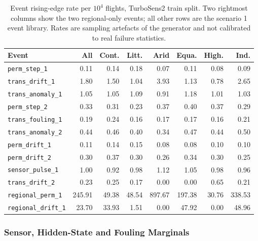 \begin{table}[h]
\centering
\caption{Event rising-edge rate per $10^4$ flights, TurboSens2 train split.
Two rightmost columns show the two regional-only events; all other rows
are the scenario 1 event library. Rates are sampling artefacts of the
generator and not calibrated to real failure statistics.}
\label{tab:scen4_event_rates}
\small
\begin{tabular}{lrrrrrrr}
\toprule
Event & All & Cont. & Litt. & Arid & Equa. & High. & Ind. \\
\midrule
\texttt{perm\_step\_1}      &   0.11 &  0.14 &  0.18 &  0.07 &  0.11 &  0.08 &  0.09 \\
\texttt{trans\_drift\_1}     &   1.80 &  1.50 &  1.04 &  3.93 &  1.13 &  0.78 &  2.65 \\
\texttt{trans\_anomaly\_1}                &   1.05 &  1.05 &  1.09 &  0.91 &  1.18 &  1.01 &  1.03 \\
\texttt{perm\_step\_2}                &   0.33 &  0.31 &  0.23 &  0.37 &  0.40 &  0.37 &  0.29 \\
\texttt{trans\_fouling\_1}        &   0.19 &  0.24 &  0.16 &  0.17 &  0.17 &  0.16 &  0.21 \\
\texttt{trans\_anomaly\_2}                &   0.44 &  0.46 &  0.40 &  0.34 &  0.47 &  0.44 &  0.50 \\
\texttt{perm\_drift\_1}     &   0.11 &  0.14 &  0.15 &  0.08 &  0.08 &  0.10 &  0.10 \\
\texttt{perm\_drift\_2}      &   0.30 &  0.37 &  0.30 &  0.26 &  0.34 &  0.30 &  0.25 \\
\texttt{sensor\_pulse\_1}        &   1.00 &  0.92 &  0.98 &  1.12 &  1.05 &  0.98 &  0.96 \\
\texttt{trans\_drift\_2}                &   0.23 &  0.25 &  0.17 &  0.00 &  0.00 &  0.65 &  0.21 \\
\midrule
\texttt{regional\_perm\_1}  & 245.91 & 49.38 & 48.54 & 897.67 & 197.38 & 30.76 & 338.53 \\
\texttt{regional\_drift\_1}  &  23.70 & 33.93 &  1.51 &   0.00 &  47.92 &  0.00 &  48.96 \\
\bottomrule
\end{tabular}
\end{table}

\subsubsection{Sensor, Hidden-State and Fouling Marginals}
\label{sec:scen4_eda_figures}


